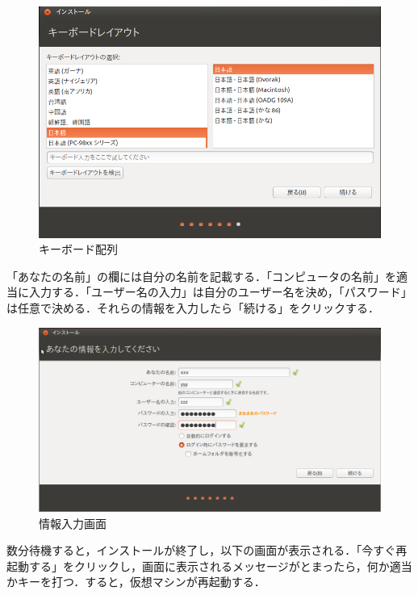 \begin{figure}[htb]
\centering
\includegraphics[width=15cm]{ubuntuinstall5.png}
\caption{キーボード配列}\label{キーボード配列}
\end{figure}
\clearpage

「あなたの名前」の欄には自分の名前を記載する．「コンピュータの名前」を適当に入力する．「ユーザー名の入力」は自分のユーザー名を決め，「パスワード」は任意で決める．それらの情報を入力したら「続ける」をクリックする．


\begin{figure}[htb]
\centering
\includegraphics[width=15cm]{ubuntuinstall6.png}
\caption{情報入力画面}\label{情報入力画面}
\end{figure}

\clearpage
数分待機すると，インストールが終了し，以下の画面が表示される．「今すぐ再起動する」をクリックし，画面に表示されるメッセージがとまったら，何か適当かキーを打つ．すると，仮想マシンが再起動する．


